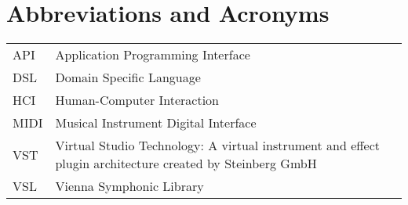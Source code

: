 \chapter*{Abbreviations and Acronyms}


\noindent
\begin{longtable}{@{}p{}p{}@{}}
API & Application Programming Interface \\
DSL & Domain Specific Language \\
HCI & Human-Computer Interaction \\
MIDI & Musical Instrument Digital Interface \\
VST & Virtual Studio Technology: A virtual instrument and effect plugin architecture created by Steinberg GmbH \\
VSL & Vienna Symphonic Library

\end{longtable}
